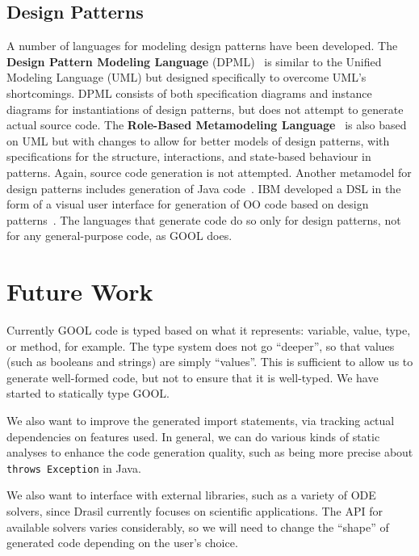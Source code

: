 \documentclass[sigplan,screen,10pt]{acmart}
\begin{document}
\subsection{Design Patterns}

A number of languages for modeling design patterns have been developed. The
\textbf{Design Pattern Modeling Language} (DPML)~\cite{mapelsden2002design} is similar
to the Unified Modeling Language (UML) but designed specifically to overcome
UML's shortcomings. DPML consists of
both specification diagrams and instance diagrams for instantiations of design
patterns, but does not attempt to generate actual source code.
The \textbf{Role-Based Metamodeling Language}~\cite{kim2003uml} is also based on UML but
with changes to allow for better models of design patterns, with specifications
for the structure, interactions, and state-based behaviour in patterns. Again,
source code generation is not attempted. Another metamodel for design patterns
includes generation of Java code~\cite{albin2001meta}. IBM developed a DSL in 
the form of a visual user interface for generation of OO code based on design 
patterns~\cite{budinsky1996automatic}. The languages that
generate code do so only for design patterns, not for any general-purpose code,
as GOOL does.

\section{Future Work} \label{sec:future}

Currently GOOL code is typed based on what it represents:
variable, value, type, or method, for example. The type system does not
go ``deeper'', so that values (such as booleans
and strings) are simply ``values''.  This is sufficient to allow us to
generate well-formed code, but not to ensure that it is well-typed.
We have started to statically type GOOL.

We also want to improve the generated import statements, via tracking
actual dependencies on features used.  In general, we can do various 
kinds of static analyses to enhance the code generation quality,
such as being more precise about \verb|throws Exception| in Java.

We also want to interface with external libraries, such as a variety of ODE
solvers, since Drasil currently focuses on scientific applications. The API for
available solvers varies considerably, so we will need to change the ``shape''
of generated code depending on the user's choice.
\end{document}
